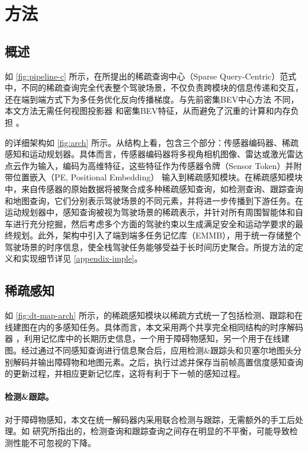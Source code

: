 \section{方法}
\label{sec:method}

\subsection{概述}

如 \cref{fig:pipeline-c} 所示，在所提出的稀疏查询中心（Sparse Query-Centric）范式中，不同的稀疏查询完全代表整个驾驶场景，不仅负责跨模块的信息传递和交互，还在端到端方式下为多任务优化反向传播梯度。与先前密集BEV中心方法 \cite{hu2023planning, jiang2023vad, ye2023fusionad} 不同，本文方法无需任何视图投影器 \cite{philion2020lift} 和密集BEV特征，从而避免了沉重的计算和内存负担 \cite{liu2022petr, jiang2023far3d, zhang2023fully}。

\model 的详细架构如 \cref{fig:arch} 所示。从结构上看，\model 包含三个部分：传感器编码器、稀疏感知和运动规划器。具体而言，传感器编码器将多视角相机图像、雷达或激光雷达点云作为输入，编码为高维特征，这些特征作为传感器令牌（Sensor Token）并附带位置嵌入（PE, Positional Embedding）\cite{liu2022petr, yan2023cross} 输入到稀疏感知模块。在稀疏感知模块中，来自传感器的原始数据将被聚合成多种稀疏感知查询，如检测查询、跟踪查询和地图查询，它们分别表示驾驶场景的不同元素，并将进一步传播到下游任务。在运动规划器中，感知查询被视为驾驶场景的稀疏表示，并针对所有周围智能体和自车进行充分挖掘，然后考虑多个方面的驾驶约束以生成满足安全和运动学要求的最终规划。此外，架构中引入了端到端多任务记忆库（EMMB），用于统一存储整个驾驶场景的时序信息，使全栈驾驶任务能够受益于长时间历史聚合。所提方法的定义和实现细节详见 \cref{appendix-imple}。

\subsection{稀疏感知}
\label{sec:sparse_perception}


如 \cref{fig:dt-map-arch} 所示，\model 的稀疏感知模块以稀疏方式统一了包括检测、跟踪和在线建图在内的多感知任务。具体而言，本文采用两个共享完全相同结构的时序解码器 \cite{wang2023exploring}，利用记忆库中的长期历史信息，一个用于障碍物感知，另一个用于在线建图。经过通过不同感知查询进行信息聚合后，应用检测\&跟踪头和贝塞尔地图头分别解码并输出障碍物和地图元素。之后，执行过滤并保存当前帧高置信度感知查询的更新过程，并相应更新记忆库，这将有利于下一帧的感知过程。

\paragraph{\textbf{检测\&跟踪。}} 对于障碍物感知，本文在统一解码器内采用联合检测与跟踪，无需额外的手工后处理。如 \cite{zhang2023motrv2, yu2023motrv3} 研究所指出的，检测查询和跟踪查询之间存在明显的不平衡，可能导致检测性能不可忽视的下降。

